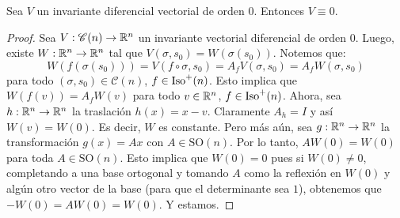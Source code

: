 \begin{prop}
Sea $V$ un invariante diferencial vectorial de orden $0$. Entonces $V\equiv 0$.
\begin{proof}
Sea $V:\mathscr{C}(n)\to\mathbb{R}^n$ un invariante vectorial diferencial de orden $0$. Luego, existe $W:\mathbb{R}^n\to\mathbb{R}^n$ tal que $V(\sigma,s_0)=W(\sigma(s_0))$. Notemos que: $$W(f(\sigma(s_0))) = V(f\circ\sigma,s_0)=A_f V(\sigma,s_0) = A_f W(\sigma,s_0)$$ para todo $(\sigma,s_0)\in\mathscr{C}(n)$, $f\in\operatorname{Iso}^+(n)$. Esto implica que $W(f(v))=A_f W(v)$ para todo $v\in\mathbb{R}^n$, $f\in\operatorname{Iso}^+(n)$. Ahora, sea $h:\mathbb{R}^n\to\mathbb{R}^n$ la traslación $h(x)=x-v$. Claramente $A_h=I$ y así $W(v)=W(0)$. Es decir, $W$ es constante. Pero más aún, sea $g:\mathbb{R}^n\to\mathbb{R}^n$ la transformación $g(x)=Ax$ con $A\in\mathrm{SO}(n)$. Por lo tanto, $AW(0)=W(0)$ para toda $A\in\mathrm{SO}(n)$. Esto implica que $W(0)=0$ pues si $W(0)\neq 0$, completando a una base ortogonal y tomando $A$ como la reflexión en $W(0)$ y algún otro vector de la base (para que el determinante sea $1$), obtenemos que $-W(0) = AW(0) = W(0)$. Y estamos.
\end{proof}
\end{prop}

